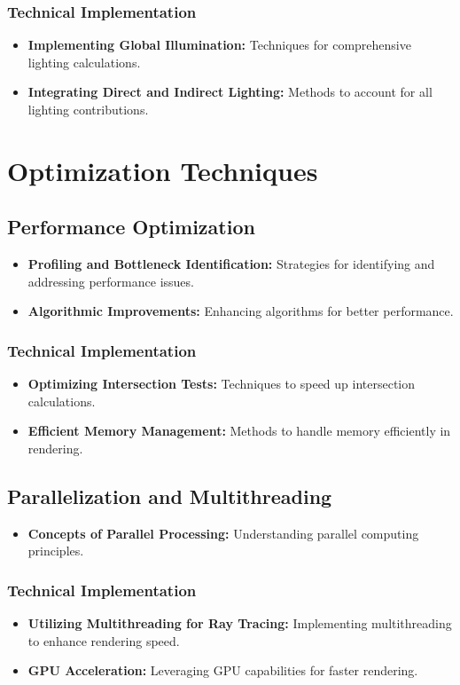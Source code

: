 \documentclass[12pt]{article}
\begin{document}
\subsubsection{Technical Implementation}
\begin{itemize}
    \item \textbf{Implementing Global Illumination:} Techniques for comprehensive lighting calculations.
    \item \textbf{Integrating Direct and Indirect Lighting:} Methods to account for all lighting contributions.
\end{itemize}

\section{Optimization Techniques}
\label{sec:optimization}
\subsection{Performance Optimization}
\begin{itemize}
    \item \textbf{Profiling and Bottleneck Identification:} Strategies for identifying and addressing performance issues.
    \item \textbf{Algorithmic Improvements:} Enhancing algorithms for better performance.
\end{itemize}
\subsubsection{Technical Implementation}
\begin{itemize}
    \item \textbf{Optimizing Intersection Tests:} Techniques to speed up intersection calculations.
    \item \textbf{Efficient Memory Management:} Methods to handle memory efficiently in rendering.
\end{itemize}
\subsection{Parallelization and Multithreading}
\begin{itemize}
    \item \textbf{Concepts of Parallel Processing:} Understanding parallel computing principles.
\end{itemize}
\subsubsection{Technical Implementation}
\begin{itemize}
    \item \textbf{Utilizing Multithreading for Ray Tracing:} Implementing multithreading to enhance rendering speed.
    \item \textbf{GPU Acceleration:} Leveraging GPU capabilities for faster rendering.
\end{itemize}
\end{document}
